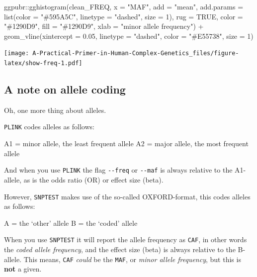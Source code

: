 \documentclass[
]{book}
\newenvironment{Shaded}{\begin{snugshade}}{\end{snugshade}}
\newcommand{\AttributeTok}[1]{\textcolor[rgb]{0.77,0.63,0.00}{#1}}
\newcommand{\ConstantTok}[1]{\textcolor[rgb]{0.00,0.00,0.00}{#1}}
\newcommand{\DecValTok}[1]{\textcolor[rgb]{0.00,0.00,0.81}{#1}}
\newcommand{\FloatTok}[1]{\textcolor[rgb]{0.00,0.00,0.81}{#1}}
\newcommand{\FunctionTok}[1]{\textcolor[rgb]{0.00,0.00,0.00}{#1}}
\newcommand{\NormalTok}[1]{#1}
\newcommand{\SpecialCharTok}[1]{\textcolor[rgb]{0.00,0.00,0.00}{#1}}
\newcommand{\StringTok}[1]{\textcolor[rgb]{0.31,0.60,0.02}{#1}}
\begin{document}
\begin{Shaded}
\begin{Highlighting}[]
\NormalTok{ggpubr}\SpecialCharTok{::}\FunctionTok{gghistogram}\NormalTok{(clean\_FREQ, }\AttributeTok{x =} \StringTok{"MAF"}\NormalTok{,}
                    \AttributeTok{add =} \StringTok{"mean"}\NormalTok{, }\AttributeTok{add.params =} \FunctionTok{list}\NormalTok{(}\AttributeTok{color =} \StringTok{"\#595A5C"}\NormalTok{, }\AttributeTok{linetype =} \StringTok{"dashed"}\NormalTok{, }\AttributeTok{size =} \DecValTok{1}\NormalTok{),}
                    \AttributeTok{rug =} \ConstantTok{TRUE}\NormalTok{,}
                    \AttributeTok{color =} \StringTok{"\#1290D9"}\NormalTok{, }\AttributeTok{fill =} \StringTok{"\#1290D9"}\NormalTok{,}
                    \AttributeTok{xlab =} \StringTok{"minor allele frequency"}\NormalTok{) }\SpecialCharTok{+}
  \FunctionTok{geom\_vline}\NormalTok{(}\AttributeTok{xintercept =} \FloatTok{0.05}\NormalTok{, }\AttributeTok{linetype =} \StringTok{"dashed"}\NormalTok{,}
                \AttributeTok{color =} \StringTok{"\#E55738"}\NormalTok{, }\AttributeTok{size =} \DecValTok{1}\NormalTok{)}
\end{Highlighting}
\end{Shaded}

\texttt{[image: A-Practical-Primer-in-Human-Complex-Genetics\_files/figure-latex/show-freq-1.pdf]}

\hypertarget{a-note-on-allele-coding}{%
\subsection{A note on allele coding}\label{a-note-on-allele-coding}}

Oh, one more thing about alleles.

\texttt{PLINK} codes alleles as follows:

A1 = minor allele, the least frequent allele
A2 = major allele, the most frequent allele

And when you use \texttt{PLINK} the flag \texttt{-\/-freq} or \texttt{-\/-maf} is always relative to the A1-allele, as is the odds ratio (OR) or effect size (beta).

However, \texttt{SNPTEST} makes use of the so-called OXFORD-format, this codes alleles as follows:

A = the `other' allele
B = the `coded' allele

When you use \texttt{SNPTEST} it will report the allele frequency as \texttt{CAF}, in other words the \emph{coded allele frequency}, and the effect size (beta) is always relative to the B-allele. This means, \texttt{CAF} \emph{could} be the \texttt{MAF}, or \emph{minor allele frequency}, but this is \textbf{not} a given.
\end{document}
